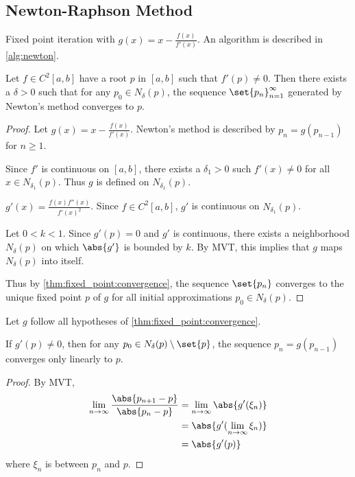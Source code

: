 \documentclass[12pt]{article}
\begin{document}
\subsection{Newton-Raphson Method} \label{sec:newton}
Fixed point iteration with $g(x) = x - \frac{f(x)}{f'(x)}$.
An algorithm is described in \cref{alg:newton}.
\begin{theorem}[Convergence] \label{thm:newton:convergence}
    Let $f \in C^2[a, b]$ have a root $p$ in $[a, b]$ such that $f'(p) \neq 0$.
    Then there exists a $\delta > 0$ such that for any $p_0 \in N_\delta(p)$,
    the sequence $\set{p_n}_{n=1}^\infty$ generated by Newton's method converges
    to $p$.
\end{theorem}
\begin{proof}
    Let $g(x) = x - \frac{f(x)}{f'(x)}$.
    Newton's method is described by $p_n = g(p_{n-1})$ for $n \geq 1$.

    Since $f'$ is continuous on $[a, b]$, there exists a $\delta_1 > 0$ such
    $f'(x) \neq 0$ for all $x \in N_{\delta_1}(p)$.
    Thus $g$ is defined on $N_{\delta_1}(p)$.

    $g'(x) = \frac{f(x)f''(x)}{f'(x)^2}$.
    Since $f \in C^2[a, b]$, $g'$ is continuous on $N_{\delta_1}(p)$.
    
    Let $0 < k < 1$.
    Since $g'(p) = 0$ and $g'$ is continuous, there exists a neighborhood
    $N_\delta(p)$ on which $\abs{g'}$ is bounded by $k$.
    By MVT, this implies that $g$ maps $N_\delta(p)$ into itself.

    Thus by \cref{thm:fixed_point:convergence}, the sequence $\set{p_n}$
    converges to the unique fixed point $p$ of $g$ for all initial
    approximations $p_0 \in N_\delta(p)$.
\end{proof}

\begin{theorem}
    Let $g$ follow all hypotheses of \cref{thm:fixed_point:convergence}.

    If $g'(p) \neq 0$, then for any
    $p_0 \in N_\delta(p) \setminus \set{p}$, the sequence $p_n = g(p_{n-1})$
    converges only linearly to $p$.
\end{theorem}
\begin{proof}
    By MVT,
    \begin{align*}
        \lim_{n \to \infty} \frac{\abs{p_{n+1} - p}}{\abs{p_n - p}}
            &= \lim_{n \to \infty} \abs{g'(\xi_n)} \\
            &= \abs{g'(\lim_{n \to \infty} \xi_n)} \\
            &= \abs{g'(p)}
    \end{align*}
    where $\xi_n$ is between $p_n$ and $p$.
\end{proof}
\end{document}
